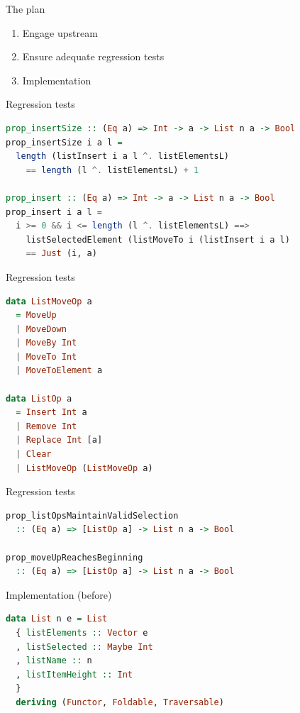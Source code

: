 \documentclass[ignorenonframetext,aspectratio=169,dvipsnames]{beamer}
\begin{document}
\begin{frame}{The plan}  %
    \begin{enumerate}
        \item Engage upstream
        \item Ensure adequate regression tests
        \item Implementation
    \end{enumerate}
\end{frame}


\begin{frame}[fragile]{Regression tests}
\begin{lstlisting}[language=Haskell]
prop_insertSize :: (Eq a) => Int -> a -> List n a -> Bool
prop_insertSize i a l =
  length (listInsert i a l ^. listElementsL)
    == length (l ^. listElementsL) + 1

prop_insert :: (Eq a) => Int -> a -> List n a -> Bool
prop_insert i a l =
  i >= 0 && i <= length (l ^. listElementsL) ==>
    listSelectedElement (listMoveTo i (listInsert i a l)
    == Just (i, a)
\end{lstlisting}
\end{frame}

\begin{frame}[fragile]{Regression tests}
\begin{lstlisting}[language=Haskell]
data ListMoveOp a
  = MoveUp
  | MoveDown
  | MoveBy Int
  | MoveTo Int
  | MoveToElement a

data ListOp a
  = Insert Int a
  | Remove Int
  | Replace Int [a]
  | Clear
  | ListMoveOp (ListMoveOp a)
\end{lstlisting}
\end{frame}

\begin{frame}[fragile]{Regression tests}
\begin{lstlisting}[language=Haskell]
prop_listOpsMaintainValidSelection
  :: (Eq a) => [ListOp a] -> List n a -> Bool

prop_moveUpReachesBeginning
  :: (Eq a) => [ListOp a] -> List n a -> Bool
\end{lstlisting}
\end{frame}

\begin{frame}[fragile]{Implementation (before)}
\begin{lstlisting}[language=Haskell]
data List n e = List
  { listElements :: Vector e
  , listSelected :: Maybe Int
  , listName :: n
  , listItemHeight :: Int
  }
  deriving (Functor, Foldable, Traversable)

 
\end{lstlisting}  %
\end{frame}
\end{document}
